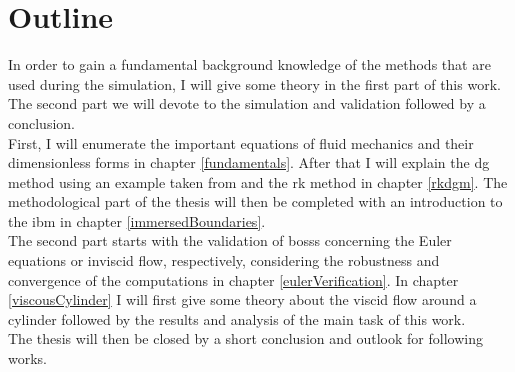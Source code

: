 \section{Outline}
In order to gain a fundamental background knowledge of the methods that are used during the simulation, I will give some theory in the first part of this work. The second part we will devote to the simulation and validation followed by a conclusion. \\ \indent
First, I will enumerate the important equations of fluid mechanics and their dimensionless forms in chapter \ref{fundamentals}. After that I will explain the \gls{dg} method using an example taken from \cite{mueller2014} and the \gls{rk} method in chapter \ref{rkdgm}. The methodological part of the thesis will then be completed with an introduction to the \gls{ibm} in chapter \ref{immersedBoundaries}. \\ \indent
The second part starts with the validation of \gls{bosss} concerning the Euler equations or inviscid flow, respectively, considering the robustness and convergence of the computations in chapter \ref{eulerVerification}. In chapter \ref{viscousCylinder} I will first give some theory about the viscid flow around a cylinder followed by the results and analysis of the main task of this work. \\ \indent
The thesis will then be closed by a short conclusion and outlook for following works.







































